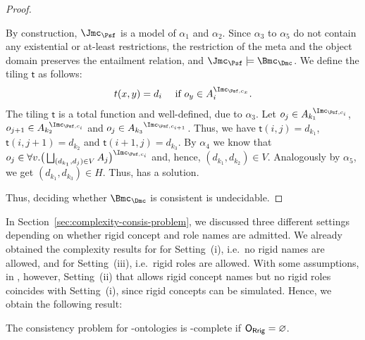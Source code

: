 \begin{proof}
\begin{claimproof}
    By construction, $\J_{\Psf}$ is a model of $\alpha_{1}$ and $\alpha_{2}$. Since $\alpha_{3}$ to
    $\alpha_{5}$ do not contain any existential or at-least restrictions, the restriction of the
    meta and the object domain preserves the entailment relation, and
    $\J_{\Psf}\models\Bmc_{\Dmc}$. We define the tiling $\mathsf{t}$ as follows:
    \begin{align*}
      t(x,y) = d_{i} \quad\text{ if $o_{y} \in A_{i}^{\I_{\Psf,c_{x}}}$}.
    \end{align*}
    The tiling $\mathsf{t}$ is a total function and well-defined, due to $\alpha_{3}$. Let
    $o_{j} \in {A_{k_{1}}}^{\!\!\!\I_{\Psf,c_{i}}}$,
    $o_{j+1} \in {A_{k_{2}}}^{\!\!\!\I_{\Psf,c_{i}}}$ and
    $o_{j} \in {A_{k_{3}}}^{\I_{\Psf,c_{i+1}}}$. Thus, we have $\mathsf{t}(i,j) = d_{k_{1}}$,
    $\mathsf{t}(i,j+1) = d_{k_{2}}$ and $\mathsf{t}(i+1,j) = d_{k_{3}}$. By $\alpha_{4}$ we know
    that
    $o_{j} \in \smash{\forall v.\big(\bigsqcup_{(d_{k_{1}},d_{j})\in V}
      A_{j}\big)^{\I_{\Psf,c_{i}}}}$ and, hence, $(d_{k_{1}}, d_{k_{2}})\in V$. Analogously by
    $\alpha_{5}$, we get $(d_{k_{1}}, d_{k_{3}})\in H$. Thus, \Dmc has a solution.
  \end{claimproof}

  Thus, deciding whether $\Bmc_{\Dmc}$ is consistent is undecidable.
\end{proof}

In Section~\ref{sec:complexity-consis-problem}, we discussed three different settings depending on
whether rigid concept and role names are admitted. We already obtained the complexity results for
\LMLOplus for Setting~(i), i.e.~no rigid names are allowed, and for Setting~(iii), i.e.~rigid roles
are allowed.  With some assumptions, in \LMLOplus, however, Setting~(ii) that allows rigid concept
names but no rigid roles coincides with Setting~(i), since rigid concepts can be simulated. Hence,
we obtain the following result:

\begin{theorem}
  The consistency problem for \SHOISHOIplus{\kern-0.1em}-ontologies is \TwoExpTime-complete if $\mathsf{O_{Rrig}}=\varnothing$.
\end{theorem}

